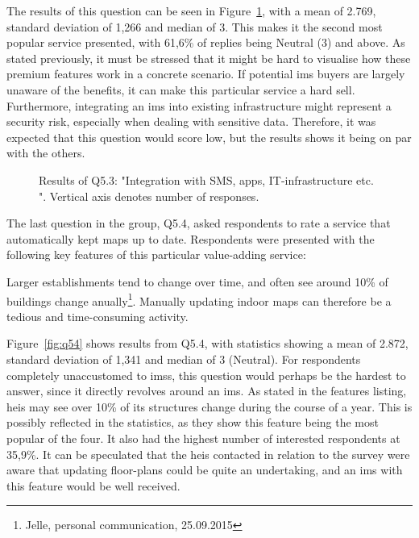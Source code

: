 The results of this question can be seen in Figure~\ref{fig:q53}, with a mean of 2.769, standard deviation of 1,266 and median of 3. This makes it the second most popular service presented, with 61,6\% of replies being Neutral (3) and above. As stated previously, it must be stressed that it might be hard to visualise how these premium features work in a concrete scenario. If potential \gls{ims} buyers are largely unaware of the benefits, it can make this particular service a hard sell. Furthermore, integrating an \gls{ims} into existing infrastructure might represent a security risk, especially when dealing with sensitive data. Therefore, it was expected that this question would score low, but the results shows it being on par with the others.  

\begin{figure}[H]
    \centering
    \caption{Results of Q5.3: "Integration with SMS, apps, IT-infrastructure etc.
". Vertical axis denotes number of responses.}
    \label{fig:q53}
\end{figure}

The last question in the group, Q5.4, asked respondents to rate a service that automatically kept maps up to date. Respondents were presented with the following key features of this particular value-adding service:

\begin{displayquote}
Larger establishments tend to change over time, and often see around 10\% of buildings change anually\footnote{Jelle, personal communication, 25.09.2015}. Manually updating indoor maps can therefore be a tedious and time-consuming activity.
\end{displayquote}

Figure~\ref{fig:q54} shows results from Q5.4, with statistics showing a mean of 2.872, standard deviation of 1,341 and median of 3 (Neutral). For respondents completely unaccustomed to \glspl{ims}, this question would perhaps be the hardest to answer, since it directly revolves around an \gls{ims}. As stated in the features listing, \glspl{hei} may see over 10\% of its structures change during the course of a year. This is possibly reflected in the statistics, as they show this feature being the most popular of the four. It also had the highest number of interested respondents at 35,9\%. It can be speculated that the \glspl{hei} contacted in relation to the survey were aware that updating floor-plans could be quite an undertaking, and an \gls{ims} with this feature would be well received. 


